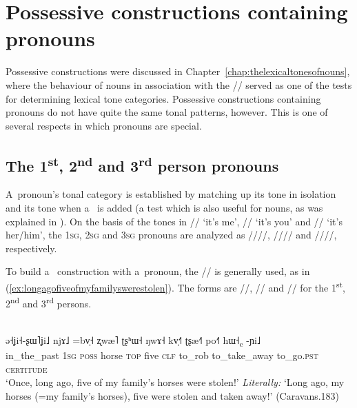 \section{Possessive constructions containing pronouns}
\label{sec:possessiveconstructionscontainingpronouns}

Possessive constructions were discussed in Chapter~\ref{chap:thelexicaltonesofnouns}, where the behaviour of nouns in association with the  // served as one of the tests for
determining lexical tone categories. Possessive constructions containing pronouns do not have quite the same tonal patterns, however. This is one of several respects in which pronouns are special.


\subsection[The 1$^{st}$, 2$^{nd}$ and 3$^{rd}$ person pronouns]{The 1\textsuperscript{st}, 2\textsuperscript{nd} and 3\textsuperscript{rd} person pronouns}
\label{sec:the1st2ndand3rdpersonpronouns}

A~pronoun's tonal category is established by matching up its tone in isolation and its tone when a~ is added (a test which is also useful for nouns, as was explained in ). On the basis of the tones in // ‘it's me’, // ‘it's you’ and // ‘it's her/him’, the \textsc{1sg}, \textsc{2sg} and \textsc{3sg} pronouns are analyzed as ////, //// and ////, respectively.

To build a~ construction with a~pronoun, the  // is generally
used, as in (\ref{ex:longagofiveofmyfamilyswerestolen}). The forms are //, // and // for the 1\textsuperscript{st},
2\textsuperscript{nd} and 3\textsuperscript{rd} persons.
\begin{exe}
  \ex
  \label{ex:longagofiveofmyfamilyswerestolen}
  \\
  \gll ə˧ʝi˧-ʂɯ˥ʝi˩	njɤ˩	=bv̩˧	ʐwæ˥	ʈʂʰɯ˧	ŋwɤ˧	kv̩˧˥	ʈʂæ˧˥ po˧˥			hɯ˧\textsubscript{c}		-ɲi˩\\
  in\_the\_past	\textsc{1sg}	\textsc{poss}	horse	\textsc{top}	five	\textsc{clf}	to\_rob to\_take\_away	to\_go.\textsc{pst}	\textsc{certitude}\\
  \glt ‘Once, long ago, five of my family’s horses were stolen!’ \textit{Literally:} ‘Long ago, my horses (=my
  family’s horses), five were stolen and taken away!’ (Caravans.183)
\end{exe}

